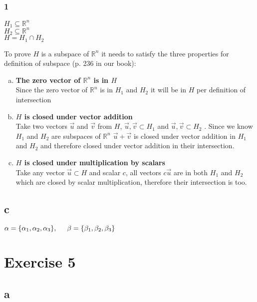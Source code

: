 \documentclass{article}
\begin{document}
\subsubsection*{1}

$H_{1} \subseteq \mathbb{R}^n$\\
$H_{2} \subseteq \mathbb{R}^n$\\
$H = H_{1} \cap H_{2}$

To prove $H$ is a subspace of $\mathbb{R}^n$ it needs to satisfy the three properties for definition of subspace (p. 236 in our book):\\
\begin{enumerate}[(a)]
    \item \textbf{The zero vector of $\mathbb{R}^n$ is in $H$}\\
			 Since the zero vector of $\mathbb{R}^{n}$ is in $H_{1}$ and $H_{2}$ it will be in $H$ per definition of intersection
    \item \textbf{$H$ is closed under vector addition}\\
			Take two vectors $\vec{u}$ and $\vec{v}$ from $H$, $\vec{u},\vec{v} \subset H_{1}$ and $\vec{u},\vec{v} \subset H_{2}$ . Since we know $H_{1}$ and $H_{2}$ are subspaces of $\mathbb{R}^{n}$ $\vec{u}+\vec{v}$ is closed under vector addition in $H_{1}$ and $H_{2}$ and therefore closed under vector addition in their intersection.
    \item\textbf{ $H$ is closed under multiplication by scalars}\\
			Take any vector $\vec{u} \subset H$ and scalar $c$, all vectors $c\vec{u}$ are in both $H_{1}$ and $H_{2}$ which are closed by scalar multiplication, therefore their intersection is too.
\end{enumerate}

\subsection*{c}

$\alpha = \{\alpha_{1}, \alpha_{2}, \alpha_{3}\}
, \hspace{5 mm}
\beta = \{\beta_{1}, \beta_{2}, \beta_{3}\}$

\newpage
\section*{Exercise 5}

\subsection*{a}
\end{document}
